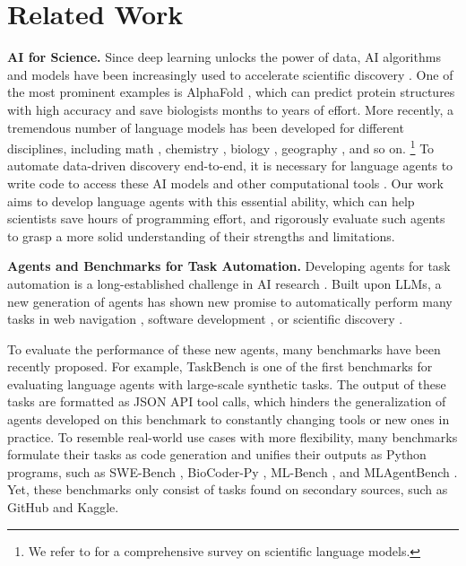 \newpage
\setcounter{table}{0}
\renewcommand\thetable{\Alph{section}.\arabic{table}}
\setcounter{figure}{0}
\renewcommand\thefigure{\Alph{section}.\arabic{figure}}

\section{Related Work}
\label{app:related_work}

%
\textbf{AI for Science.}
Since deep learning unlocks the power of data, AI algorithms and models have been increasingly used to accelerate scientific discovery \citep{ai4science_bengio}.
One of the most prominent examples is AlphaFold \citep{alphafold}, which can predict protein structures with high accuracy and save biologists months to years of effort.
More recently, a tremendous number of language models has been developed for different disciplines, including math \citep{yue2024mammoth}, chemistry \citep{yu2024llasmol}, biology \citep{labrak-etal-2024-biomistral}, geography \citep{li-etal-2023-geolm}, and so on.
\footnote{We refer to \citet{zhang2024comprehensivesurveyscientificlarge} for a comprehensive survey on scientific language models.}
To automate data-driven discovery end-to-end, it is necessary for language agents to write code to access these AI models and other computational tools \citep{ds_survey}.
Our work aims to develop language agents with this essential ability, which can help scientists save hours of programming effort, and rigorously evaluate such agents to grasp a more solid understanding of their strengths and limitations.
%

%
\textbf{Agents and Benchmarks for Task Automation.}
Developing agents for task automation is a long-established challenge in AI research \citep{russel2010}.
Built upon LLMs, a new generation of agents has shown new promise to automatically perform many tasks in web navigation \citep{deng2023mindweb, he-etal-2024-webvoyager, koh-etal-2024-visualwebarena, pmlr-v235-zheng24e, zhou2024webarena}, software development \citep{jimenez2024swebench, wang2024opendevinopenplatformai, yang2024sweagent}, or scientific discovery \citep{coscientist, doi:10.1021/acscentsci.3c01087, lu2024aiscientistfullyautomated}.
%

%
To evaluate the performance of these new agents, many benchmarks have been recently proposed. 
For example, TaskBench \citep{shen2024taskbench} is one of the first benchmarks for evaluating language agents with large-scale synthetic tasks.
The output of these tasks are formatted as JSON API tool calls, which hinders the generalization of agents developed on this benchmark to constantly changing tools or new ones in practice.
To resemble real-world use cases with more flexibility, many benchmarks formulate their tasks as code generation and unifies their outputs as Python programs, such as SWE-Bench \citep{jimenez2024swebench}, BioCoder-Py \citep{10.1093/bioinformatics/btae230}, ML-Bench \citep{tang2024mlbenchevaluatinglargelanguage}, and MLAgentBench \citep{huang2024mlagentbench}.
Yet, these benchmarks only consist of tasks found on secondary sources, such as GitHub and Kaggle.
%

